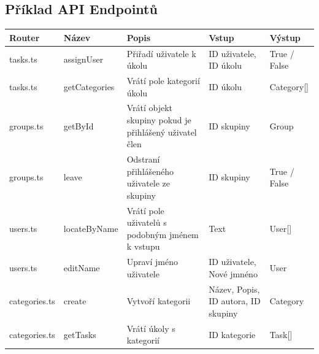 \subsection{Příklad API Endpointů}
    \begin{tabularx}{1\textwidth} { 
  | >{\centering\arraybackslash}X 
  | >{\centering\arraybackslash}X 
  | >{\centering\arraybackslash}X 
  | >{\centering\arraybackslash}X 
  | >{\centering\arraybackslash}X | }
     \hline
        \textbf{Router} & \textbf{Název} & \textbf{Popis} & \textbf{Vstup} & \textbf{Výstup}\\
         \hline
         tasks.ts & assignUser & Přiřadí uživatele k úkolu & ID uživatele, ID úkolu & True / False\\
          \hline
         tasks.ts & getCategories & Vrátí pole kategorií úkolu & ID úkolu & Category[]\\
         \hline
         groups.ts & getById & Vrátí objekt skupiny pokud je přihlášený uživatel člen & ID skupiny & Group\\
         \hline
         groups.ts & leave & Odstraní přihlášeného uživatele ze skupiny & ID skupiny & True / False\\
         \hline
         users.ts & locateByName & Vrátí pole uživatelů s podobným jménem k vstupu & Text & User[]\\
         \hline
         users.ts & editName & Upraví jméno uživatele & ID uživatele, Nové jmnéno & User\\
         \hline
         categories.ts & create & Vytvoří kategorii & Název, Popis, ID autora, ID skupiny & Category\\
         \hline
         categories.ts & getTasks & Vrátí úkoly s kategorií & ID kategorie & Task[]\\
         \hline
    \end{tabularx}